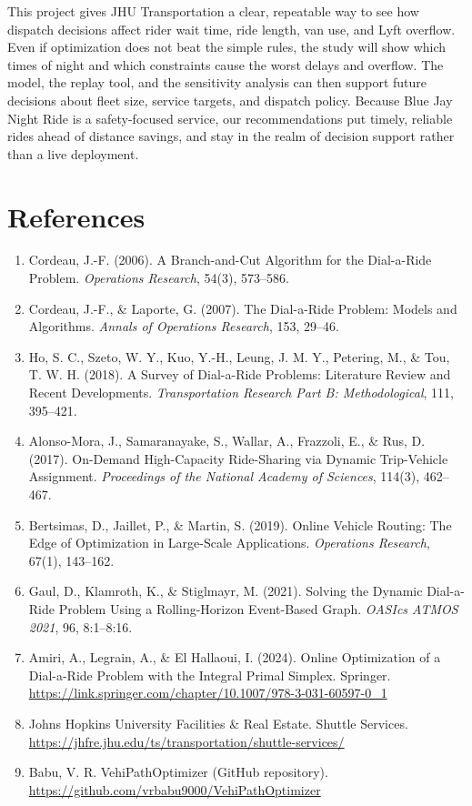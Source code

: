 \documentclass{article}
\begin{document}
This project gives JHU Transportation a clear, repeatable way to see how dispatch decisions affect rider wait time, ride length, van use, and Lyft overflow. Even if optimization does not beat the simple rules, the study will show which times of night and which constraints cause the worst delays and overflow. The model, the replay tool, and the sensitivity analysis can then support future decisions about fleet size, service targets, and dispatch policy. Because Blue Jay Night Ride is a safety-focused service, our recommendations put timely, reliable rides ahead of distance savings, and stay in the realm of decision support rather than a live deployment.

\vskip -0.1in
\section{References}
\vskip -0.1in

{\small
\begin{enumerate}\itemsep 2pt \parskip 0pt
\item Cordeau, J.-F. (2006). A Branch-and-Cut Algorithm for the Dial-a-Ride Problem. \emph{Operations Research}, 54(3), 573--586.
\item Cordeau, J.-F., \& Laporte, G. (2007). The Dial-a-Ride Problem: Models and Algorithms. \emph{Annals of Operations Research}, 153, 29--46.
\item Ho, S. C., Szeto, W. Y., Kuo, Y.-H., Leung, J. M. Y., Petering, M., \& Tou, T. W. H. (2018). A Survey of Dial-a-Ride Problems: Literature Review and Recent Developments. \emph{Transportation Research Part B: Methodological}, 111, 395--421.
\item Alonso-Mora, J., Samaranayake, S., Wallar, A., Frazzoli, E., \& Rus, D. (2017). On-Demand High-Capacity Ride-Sharing via Dynamic Trip-Vehicle Assignment. \emph{Proceedings of the National Academy of Sciences}, 114(3), 462--467.
\item Bertsimas, D., Jaillet, P., \& Martin, S. (2019). Online Vehicle Routing: The Edge of Optimization in Large-Scale Applications. \emph{Operations Research}, 67(1), 143--162.
\item Gaul, D., Klamroth, K., \& Stiglmayr, M. (2021). Solving the Dynamic Dial-a-Ride Problem Using a Rolling-Horizon Event-Based Graph. \emph{OASIcs ATMOS 2021}, 96, 8:1--8:16.
\item Amiri, A., Legrain, A., \& El Hallaoui, I. (2024). Online Optimization of a Dial-a-Ride Problem with the Integral Primal Simplex. Springer. \url{https://link.springer.com/chapter/10.1007/978-3-031-60597-0_1}
\item Johns Hopkins University Facilities \& Real Estate. Shuttle Services. \url{https://jhfre.jhu.edu/ts/transportation/shuttle-services/}
\item Babu, V. R. VehiPathOptimizer (GitHub repository). \url{https://github.com/vrbabu9000/VehiPathOptimizer}
\end{enumerate}
}
\end{document}

